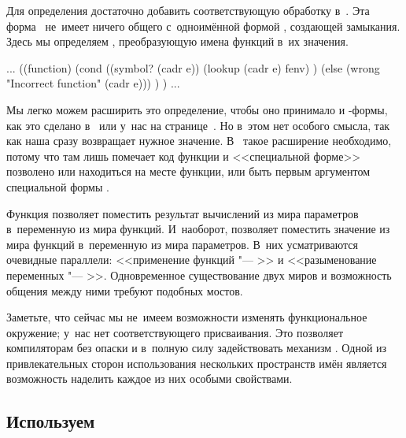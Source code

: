 Для определения  достаточно добавить соответствующую обработку
в~. Эта форма~ не~имеет ничего общего с~одноимённой
 формой
, создающей замыкания. Здесь
мы определяем , преобразующую имена функций
в~их значения.

\begin{code:lisp}
...
((function)
 (cond ((symbol? (cadr e))
        (lookup (cadr e) fenv) )
       (else (wrong "Incorrect function" (cadr e))) ) ) ...
\end{code:lisp}

Мы легко можем расширить это определение, чтобы оно принимало и
-формы, как это сделано в~{\CommonLisp} или у~нас на
странице~\pageref{basics/repr-func/dyn-and-lex-bind/src:closure-eval}. Но в~этом
нет особого смысла, так как наша  сразу возвращает нужное значение.
В~{\CommonLisp} такое расширение необходимо, потому что там  лишь
помечает код функции и <<специальной форме>>  позволено или
находиться на месте функции, или быть первым аргументом специальной формы
.

Функция  позволяет поместить результат вычислений из мира параметров
в~переменную из мира функций. И~наоборот,  позволяет поместить
значение из мира функций в~переменную из мира параметров. В~них усматриваются
очевидные параллели: <<применение функций "--- >> и <<разыменование
переменных "--- >>. Одновременное существование двух миров и
возможность общения между ними требуют подобных мостов.

Заметьте, что сейчас мы не~имеем возможности изменять функциональное окружение;
у~нас нет соответствующего присваивания. Это позволяет компиляторам без опаски
и в~полную силу задействовать механизм . Одной из
привлекательных сторон использования нескольких пространств имён является
возможность наделить каждое из них особыми свойствами.


\subsection{\texorpdfstring{Используем \protect{}}{Используем Lisp₂}}%
\label{lisp1-2-omega/lisp2/ssect:using}

